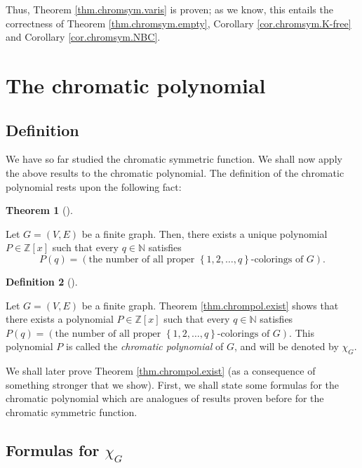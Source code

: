 \documentclass[numbers=enddot,12pt,final,onecolumn,notitlepage]{scrartcl}%
\theoremstyle{definition}
\newtheorem{theo}{Theorem}[section]
\newenvironment{theorem}[1][]
{\begin{theo}[#1]\begin{leftbar}}
{\end{leftbar}\end{theo}}
\newtheorem{defi}[theo]{Definition}
\newenvironment{definition}[1][]
{\begin{defi}[#1]\begin{leftbar}}
{\end{leftbar}\end{defi}}
\begin{document}
Thus, Theorem \ref{thm.chromsym.varis} is proven; as we know, this entails the
correctness of Theorem \ref{thm.chromsym.empty}, Corollary
\ref{cor.chromsym.K-free} and Corollary \ref{cor.chromsym.NBC}.


\section{\label{sec.chrompol}The chromatic polynomial}

\subsection{Definition}

We have so far studied the chromatic symmetric function. We shall now apply
the above results to the chromatic polynomial. The definition of the chromatic
polynomial rests upon the following fact:

\begin{theorem}
\label{thm.chrompol.exist}Let $G=\left(  V,E\right)  $ be a finite graph.
Then, there exists a unique polynomial $P\in\mathbb{Z}\left[  x\right]  $ such
that every $q\in\mathbb{N}$ satisfies%
\[
P\left(  q\right)  =\left(  \text{the number of all proper }\left\{
1,2,\ldots,q\right\}  \text{-colorings of }G\right)  .
\]

\end{theorem}

\begin{definition}
\label{def.chrompol}Let $G=\left(  V,E\right)  $ be a finite graph. Theorem
\ref{thm.chrompol.exist} shows that there exists a polynomial $P\in
\mathbb{Z}\left[  x\right]  $ such that every $q\in\mathbb{N}$ satisfies
$P\left(  q\right)  =\left(  \text{the number of all proper }\left\{
1,2,\ldots,q\right\}  \text{-colorings of }G\right)  $. This polynomial $P$ is
called the \emph{chromatic polynomial} of $G$, and will be denoted by
$\chi_{G}$.
\end{definition}

We shall later prove Theorem \ref{thm.chrompol.exist} (as a consequence of
something stronger that we show). First, we shall state some formulas for the
chromatic polynomial which are analogues of results proven before for the
chromatic symmetric function.

\subsection{Formulas for $\chi_{G}$}
\end{document}
